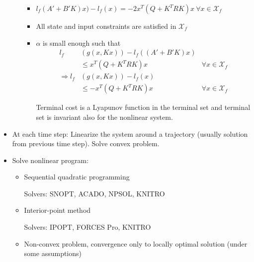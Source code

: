 \documentclass[8pt,a4paper]{scrartcl}
\begin{document}
\begin{multicols*}{3}
\begin{itemize}
\begin{itemize}
\begin{itemize}
\item $l_f(A'+B'K)x)-l_f(x)=-2x^T(Q+K^TRK)x\ \forall x\in\mathcal{X}_f$
\item All state and input constraints are satisfied in $\mathcal{X}_f$
\item $\alpha$ is small enough such that
\begin{align*}
l_f&(g(x,Kx))-l_f((A'+B'K)x)\\
&\leq x^T(Q+K^TRK)x&\forall x\in\mathcal{X}_f\\
\Rightarrow l_f&(g(x,Kx))-l_f(x)\\
&\leq -x^T(Q+K^TRK)x&\forall x\in\mathcal{X}_f
\end{align*}

Terminal cost is a Lyapunov function in the terminal set and terminal set is invariant also for the nonlinear system.
\end{itemize}
\end{itemize}
\item At each time step: Linearize the system around a trajectory (usually solution from previous time step). Solve convex problem.
\item Solve nonlinear program:
\begin{itemize}
\item Sequential quadratic programming

Solvers: SNOPT, ACADO, NPSOL, KNITRO
\item Interior-point method

Solvers: IPOPT, FORCES Pro, KNITRO
\item Non-convex problem, convergence only to locally optimal solution (under some assumptions)
\end{itemize}
\end{itemize}

\end{multicols*}
\end{document}
